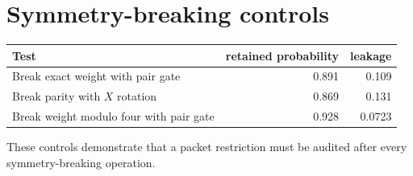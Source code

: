 \section{Symmetry-breaking controls}
\begin{center}
\begin{tabular}{@{}lrr@{}}
\toprule
Test & retained probability & leakage\\
\midrule
Break exact weight with pair gate & 0.891 & 0.109\\
Break parity with $X$ rotation & 0.869 & 0.131\\
Break weight modulo four with pair gate & 0.928 & 0.0723\\
\bottomrule
\end{tabular}
\end{center}

These controls demonstrate that a packet restriction must be audited after every symmetry-breaking operation.
